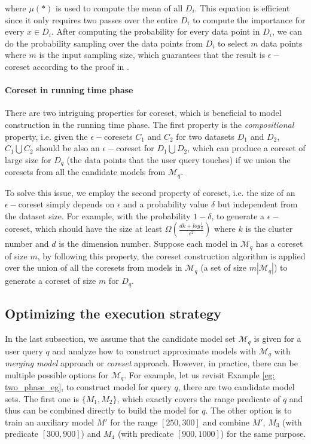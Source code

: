 where $\mu(*)$ is used to compute the mean of all $D_i$. This equation is efficient since it only requires two passes over the entire $D_i$ to compute the importance for every $x \in D_i$. After computing the probability for every data point in $D_i$, we can do the probability sampling over the data points from $D_i$ to select $m$ data points where $m$ is the input sampling size, which guarantees that the result is $\epsilon-$coreset according to the proof in \cite{bachem2017scalable}.

\paragraph{Coreset in running time phase} There are two intriguing properties for coreset, which is beneficial to model construction in the running time phase. The first property is the {\em compositional} property, i.e. given the $\epsilon-$coresets $C_1$ and $C_2$ for two datasets $D_1$ and $D_2$, $C_1 \bigcup C_2$ should be also an $\epsilon-$coreset for $D_1 \bigcup D_2$, which can produce a coreset of large size for $D_q$ (the data points that the user query touches) if we union the coresets from all the candidate models from $\mathcal{M}_q$. 

To solve this issue, we employ the second property of coreset, i.e. the size of an $\epsilon-$coreset simply depends on $\epsilon$ and a probability value $\delta$ but independent from the dataset size. For example, with the probability $1-\delta$, to generate a $\epsilon-$coreset, which should have the size at least $\Omega(\frac{dk+log\frac{1}{\delta}}{\epsilon^2})$ where $k$ is the cluster number and $d$ is the dimension number. Suppose each model in $\mathcal{M}_q$ has a coreset of size $m$, by following this property, the coreset construction algorithm is applied over the union of all the coresets from models in $\mathcal{M}_q$ (a set of size $m|\mathcal{M}_q|$) to generate a coreset of size $m$ for $D_q$.


\subsection{Optimizing the execution strategy}\label{sec: opt}
In the last subsection, we assume that the candidate model set $\mathcal{M}_q$ is given for a user query $q$ and analyze how to construct approximate models with $\mathcal{M}_q$ with {\em merging model} approach or {\em coreset} approach. However, in practice, there can be multiple possible options for $\mathcal{M}_q$. For example, let us revisit Example \ref{eg: two_phase_eg}, to construct model for query $q$, there are two candidate model sets. The first one is $\{M_1, M_2\}$, which exactly covers the range predicate of $q$ and thus can be combined directly to build the model for $q$. The other option is to train an auxiliary model $M'$ for the range $[250, 300]$ and combine $M'$, $M_3$ (with predicate $[300, 900]$) and $M_4$ (with predicate $[900, 1000]$) for the same purpose. 

